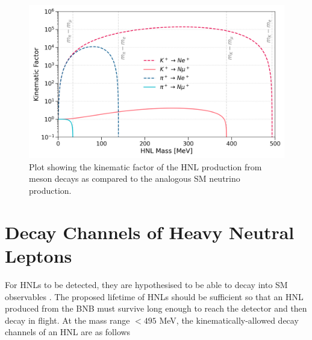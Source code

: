 
\begin{figure}[t] 
\centering    
\includegraphics[width=1.0\textwidth]{kinematics_factor}
\caption[Kinematic Factor of Heavy Neutral Leptons]{
Plot showing the kinematic factor of the HNL production from meson decays as compared to the analogous SM neutrino production.
}
\label{fig:KinematicsFactor}
\end{figure}

\section{Decay Channels of Heavy Neutral Leptons}
\label{sec2Decay}


For HNLs to be detected, they are hypothesised to be able to decay into SM observables \cite{HNLKelly}.
The proposed lifetime of HNLs should be sufficient so that an HNL produced from the BNB must survive long enough to reach the detector and then decay in flight.
At the mass range $< 495$ MeV, the kinematically-allowed decay channels of an HNL are as follows \cite{SBNHNL}


